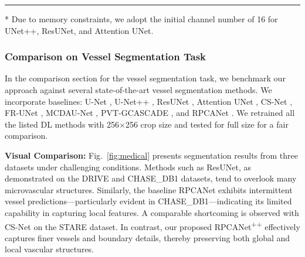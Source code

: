 \documentclass[10pt,journal,compsoc]{IEEEtran}
\makeatletter
\newcommand{\thickhline}{%

    \noalign {\ifnum 0=`}\fi \hrule height 1pt
    \futurelet \reserved@a \@xhline
}
\makeatother
\begin{document}
\begin{table*}[!ht]
\begin{threeparttable}
{\begin{tabular}
\hline\thickhline
\end{tabular}}
\begin{tablenotes} 
\tiny%
\item[*]Due to memory constraints, we adopt the initial channel number of 16 for UNet++, ResUNet, and Attention UNet.
\end{tablenotes}
\end{threeparttable}
\label{tab:defect}
\vspace{-0.4cm}
\end{table*}

\subsubsection{Comparison on Vessel Segmentation Task}
In the comparison section for the vessel segmentation task, we benchmark our approach against several state-of-the-art vessel segmentation methods. We incorporate baselines: U-Net \cite{ronneberger-2015-unet}, U-Net++ \cite{zhou-2018-unetplusplus}, ResUNet \cite{li-2019-resunet}, Attention UNet \cite{oktay-2018-attnunet}, CS-Net \cite{mou-2019-csnet}, FR-UNet \cite{liu-2022-frunet}, MCDAU-Net \cite{zhou-2023-MCDAUNet}, PVT-GCASCADE \cite{rahman-2024-gcascade}, and RPCANet \cite{wu-2024-rpcanet}. We retrained all the listed DL methods with 256$\times$256 crop size and tested for full size for a fair comparison.

\noindent\textbf{Visual Comparison:} 
Fig.~\ref{fig:medical} presents segmentation results from three datasets under challenging conditions. Methods such as ResUNet, as demonstrated on the DRIVE and CHASE\_DB1 datasets, tend to overlook many microvascular structures. Similarly, the baseline RPCANet exhibits intermittent vessel predictions—particularly evident in CHASE\_DB1—indicating its limited capability in capturing local features. A comparable shortcoming is observed with CS-Net on the STARE dataset. In contrast, our proposed RPCANet\textsuperscript{++} effectively captures finer vessels and boundary details, thereby preserving both global and local vascular structures.
\end{document}
